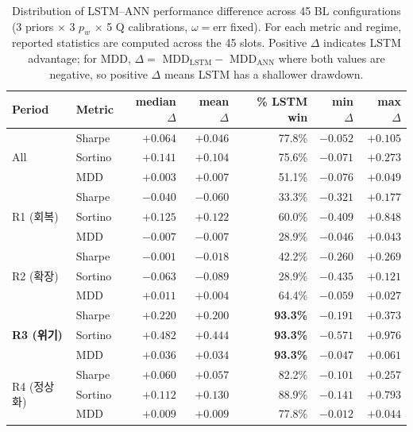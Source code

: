
\begin{table}[ht]
\centering
\caption{Distribution of LSTM--ANN performance difference across 45 BL configurations (3 priors $\times$ 3 $p_w$ $\times$ 5 Q calibrations, $\omega=$err fixed). For each metric and regime, reported statistics are computed across the 45 slots. Positive $\Delta$ indicates LSTM advantage; for MDD, $\Delta = $ MDD$_\mathrm{LSTM} - $ MDD$_\mathrm{ANN}$ where both values are negative, so positive $\Delta$ means LSTM has a shallower drawdown.}
\label{tab:45slot_summary}
\setlength{\tabcolsep}{6pt}
\renewcommand{\arraystretch}{1.15}
\small
\begin{tabular}{ll rrrrr}
\toprule
Period & Metric & median $\Delta$ & mean $\Delta$ & \% LSTM win & min $\Delta$ & max $\Delta$ \\
\midrule
\multirow{3}{*}{All}
 & Sharpe  & $+0.064$ & $+0.046$ & 77.8\% & $-0.052$ & $+0.105$ \\
 & Sortino & $+0.141$ & $+0.104$ & 75.6\% & $-0.071$ & $+0.273$ \\
 & MDD     & $+0.003$ & $+0.007$ & 51.1\% & $-0.076$ & $+0.049$ \\
\midrule
\multirow{3}{*}{R1 (회복)}
 & Sharpe  & $-0.040$ & $-0.060$ & 33.3\% & $-0.321$ & $+0.177$ \\
 & Sortino & $+0.125$ & $+0.122$ & 60.0\% & $-0.409$ & $+0.848$ \\
 & MDD     & $-0.007$ & $-0.007$ & 28.9\% & $-0.046$ & $+0.043$ \\
\midrule
\multirow{3}{*}{R2 (확장)}
 & Sharpe  & $-0.001$ & $-0.018$ & 42.2\% & $-0.260$ & $+0.269$ \\
 & Sortino & $-0.063$ & $-0.089$ & 28.9\% & $-0.435$ & $+0.121$ \\
 & MDD     & $+0.011$ & $+0.004$ & 64.4\% & $-0.059$ & $+0.027$ \\
\midrule
\multirow{3}{*}{\textbf{R3 (위기)}}
 & Sharpe  & $\mathbf{+0.220}$ & $+0.200$ & \textbf{93.3\%} & $-0.191$ & $+0.373$ \\
 & Sortino & $\mathbf{+0.482}$ & $+0.444$ & \textbf{93.3\%} & $-0.571$ & $+0.976$ \\
 & MDD     & $\mathbf{+0.036}$ & $+0.034$ & \textbf{93.3\%} & $-0.047$ & $+0.061$ \\
\midrule
\multirow{3}{*}{R4 (정상화)}
 & Sharpe  & $+0.060$ & $+0.057$ & 82.2\% & $-0.101$ & $+0.257$ \\
 & Sortino & $+0.112$ & $+0.130$ & 88.9\% & $-0.141$ & $+0.793$ \\
 & MDD     & $+0.009$ & $+0.009$ & 77.8\% & $-0.012$ & $+0.044$ \\
\bottomrule
\end{tabular}
\end{table}
